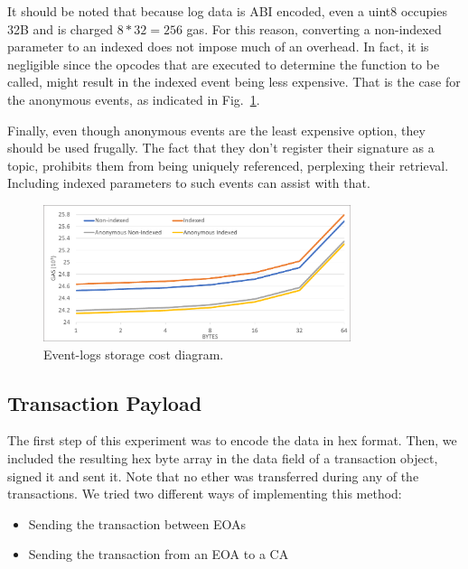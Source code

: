 It should be noted that because log data is ABI encoded, even a uint8 occupies 32B and is charged \( 8*32 = 256 \) gas. For this reason, converting a non-indexed parameter to an indexed does not impose much of an overhead. In fact, it is negligible since the opcodes that are executed to determine the function to be called, might result in the indexed event being less expensive. That is the case for the anonymous events, as indicated in Fig.~\ref{fig:logs}.

Finally, even though anonymous events are the least expensive option, they should be used frugally. The fact that they don’t register their signature as a topic, prohibits them from being uniquely referenced, perplexing their retrieval. Including indexed parameters to such events can assist with that.


\begin{figure}[htbp]
\centerline{\includegraphics[width=9cm]{figs/logs_1.pdf}}
\caption{Event-logs storage cost diagram.}
\label{fig:logs}
\end{figure}

\subsection{Transaction Payload}\label{subsection:}
The first step of this experiment was to encode the data in hex format. Then, we included the resulting hex byte array in the data field of a transaction object, signed it and sent it. Note that no ether was transferred during any of the transactions. We tried two different ways of implementing this method:

\begin{itemize}[topsep=0pt, itemsep=0pt]
  \item Sending the transaction between EOAs
  \item Sending the transaction from an EOA to a CA
\end{itemize}

